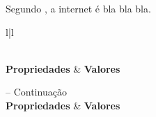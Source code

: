 Segundo , a internet é bla bla bla.






\begin{longtable}{l|l}
\caption[Dados do APL de Confec\c{c}\~oes de Salvador]{S\'intese
dos valores das propriedades de redes obtidas do APL de
Confec\c{c}\~oes de Salvador.} \label{table:propriedadesAPL}

\\\hline \textbf{Propriedades} & \textbf{Valores}
\\\hline
\endfirsthead

 {{\tablename} \thetable{} -- Continua\c{c}\~ao}
\\\hline \textbf{Propriedades}       & \textbf{Valores}
\\\hline
\endhead

\endfoot
\endlastfoot


\end{longtable}
